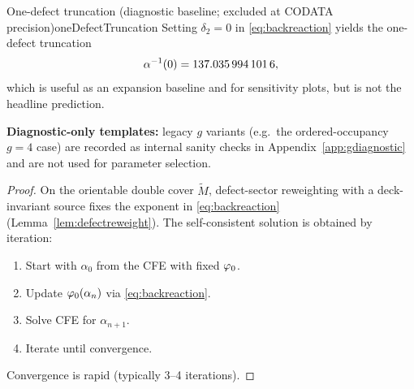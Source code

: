 \begin{lemma}{One-defect truncation (diagnostic baseline; excluded at CODATA precision)}{oneDefectTruncation}
Setting $\delta_2=0$ in \eqref{eq:backreaction} yields the one-defect truncation
\[
\alpha^{-1}(0)=\num[round-mode=places,round-precision=10]{\TFPTalphaInvSelfNum},
\]
which is useful as an expansion baseline and for sensitivity plots, but is not the headline prediction.
\end{lemma}

\begin{remark}
\textbf{Diagnostic-only templates:} legacy $g$ variants (e.g.\ the ordered-occupancy $g=4$ case) are
recorded as internal sanity checks in Appendix~\ref{app:gdiagnostic} and are not used for
parameter selection.
\end{remark}

\begin{proof}
On the orientable double cover $\widetilde{M}$, defect-sector reweighting with a
deck-invariant source fixes the exponent in \eqref{eq:backreaction}
(Lemma~\ref{lem:defectreweight}). The self-consistent solution is obtained by iteration:
\begin{enumerate}
    \item Start with $\alpha_0$ from the CFE with fixed $\varphi_0$.
    \item Update $\varphi_0(\alpha_n)$ via \eqref{eq:backreaction}.
    \item Solve CFE for $\alpha_{n+1}$.
    \item Iterate until convergence.
\end{enumerate}
Convergence is rapid (typically 3--4 iterations).
\end{proof}


